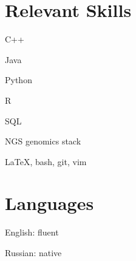 \section{Relevant Skills}
\begin{innerlist}
  \item C++
  \item Java
  \item Python
  \item R
  \item SQL %
  \item NGS genomics stack
  \item \LaTeX, bash, git, vim
\end{innerlist}

\section{Languages}
\begin{innerlist}
  \item English: fluent
  \item Russian: native 
\end{innerlist}
